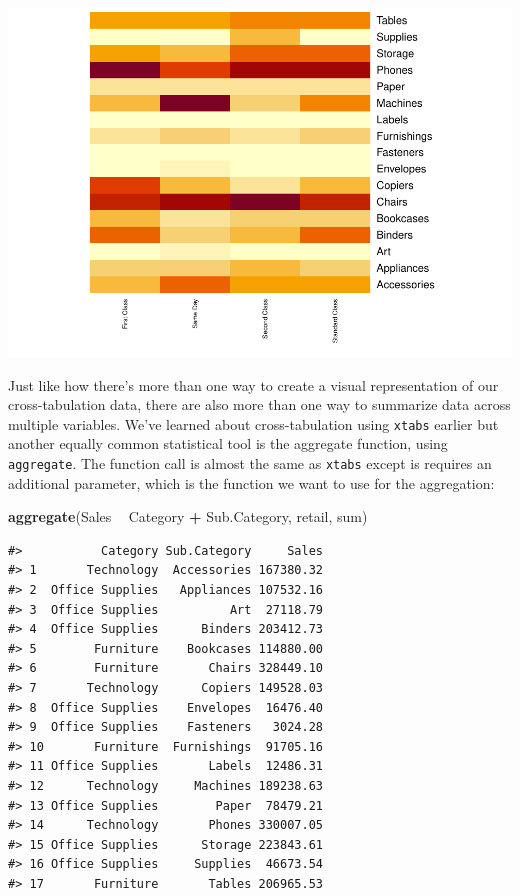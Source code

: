 \documentclass[]{article}
\newenvironment{Shaded}{\begin{snugshade}}{\end{snugshade}}
\newcommand{\KeywordTok}[1]{\textcolor[rgb]{0.13,0.29,0.53}{\textbf{#1}}}
\newcommand{\NormalTok}[1]{#1}
\newcommand{\OperatorTok}[1]{\textcolor[rgb]{0.81,0.36,0.00}{\textbf{#1}}}
\newcommand{\StringTok}[1]{\textcolor[rgb]{0.31,0.60,0.02}{#1}}
\begin{document}
\begin{center}\includegraphics{p4ds_files/figure-latex/unnamed-chunk-48-1} \end{center}

Just like how there's more than one way to create a visual
representation of our cross-tabulation data, there are also more than
one way to summarize data across multiple variables. We've learned about
cross-tabulation using \texttt{xtabs} earlier but another equally common
statistical tool is the aggregate function, using \texttt{aggregate}.
The function call is almost the same as \texttt{xtabs} except is
requires an additional parameter, which is the function we want to use
for the aggregation:

\begin{Shaded}
\begin{Highlighting}[]
\KeywordTok{aggregate}\NormalTok{(Sales }\OperatorTok{~}\StringTok{ }\NormalTok{Category }\OperatorTok{+}\StringTok{ }\NormalTok{Sub.Category, retail, sum)}
\end{Highlighting}
\end{Shaded}

\begin{verbatim}
#>           Category Sub.Category     Sales
#> 1       Technology  Accessories 167380.32
#> 2  Office Supplies   Appliances 107532.16
#> 3  Office Supplies          Art  27118.79
#> 4  Office Supplies      Binders 203412.73
#> 5        Furniture    Bookcases 114880.00
#> 6        Furniture       Chairs 328449.10
#> 7       Technology      Copiers 149528.03
#> 8  Office Supplies    Envelopes  16476.40
#> 9  Office Supplies    Fasteners   3024.28
#> 10       Furniture  Furnishings  91705.16
#> 11 Office Supplies       Labels  12486.31
#> 12      Technology     Machines 189238.63
#> 13 Office Supplies        Paper  78479.21
#> 14      Technology       Phones 330007.05
#> 15 Office Supplies      Storage 223843.61
#> 16 Office Supplies     Supplies  46673.54
#> 17       Furniture       Tables 206965.53
\end{verbatim}
\end{document}
